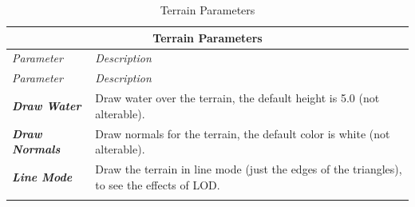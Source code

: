 \begin{center}
	\begin{longtable}{ | p{} | p{} | }
		
		\hline
		\multicolumn{2}{|c|}{\textbf{Terrain Parameters}}
		\\ \hline
		
		\emph{Parameter} & \emph{Description}
		\\ \hline \hline
		\endfirsthead %
		
		\hline
		\emph{Parameter} & \emph{Description}
		\\ \hline \hline
		\endhead %
	
		\hline
		\endfoot %
		
		\endlastfoot %
		
		\emph{\textbf{Draw Water}}
		& Draw water over the terrain, the default height is 5.0 (not alterable).
		\\ \hline
		
		\emph{\textbf{Draw Normals}}
		& Draw normals for the terrain, the default color is white (not alterable).
		\\ \hline
		
		\emph{\textbf{Line Mode}}
		& Draw the terrain in line mode (just the edges of the triangles), to see the effects of LOD.
		\\ \hline
				
		\caption{Terrain Parameters}
		\label{tab:terrain_params}		
	\end{longtable}
\end{center}